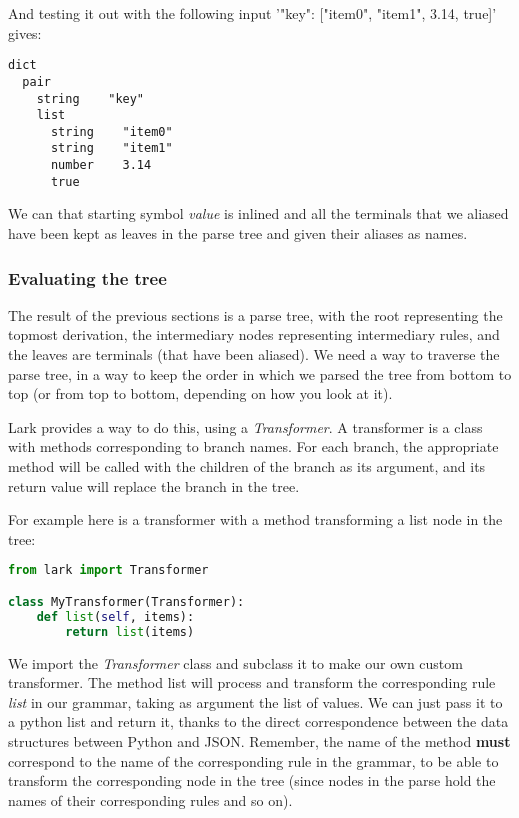 \documentclass[12pt]{article}
\begin{document}
And testing it out with the following input '{"key": ["item0", "item1", 3.14, true]}' gives:

\begin{lstlisting}
dict
  pair
    string    "key"
    list
      string    "item0"
      string    "item1"
      number    3.14
      true
\end{lstlisting}

We can that starting symbol \emph{value} is inlined and all the terminals that we aliased have been kept as leaves in the parse tree and given their aliases as names.

\subsubsection{Evaluating the tree}
The result of the previous sections is a parse tree, with the root representing the topmost derivation, the intermediary nodes representing intermediary rules, and the leaves are terminals (that have been aliased). We need a way to traverse the parse tree, in a way to keep the order in which we parsed the tree from bottom to top (or from top to bottom, depending on how you look at it).

Lark provides a way to do this, using a \emph{Transformer}. A transformer is a class with methods corresponding to branch names. For each branch, the appropriate method will be called with the children of the branch as its argument, and its return value will replace the branch in the tree.

For example here is a transformer with a method transforming a list node in the tree:
\begin{lstlisting}[language=Python]
from lark import Transformer

class MyTransformer(Transformer):
    def list(self, items):
        return list(items)

\end{lstlisting}

We import the \emph{Transformer} class and subclass it to make our own custom transformer. The method list will process and transform the corresponding rule \emph{list} in our grammar, taking as argument the list of values. We can just pass it to a python list and return it, thanks to the direct correspondence between the data structures between Python and JSON. Remember, the name of the method \textbf{must} correspond to the name of the corresponding rule in the grammar, to be able to transform the corresponding node in the tree (since nodes in the parse hold the names of their corresponding rules and so on).
\end{document}
